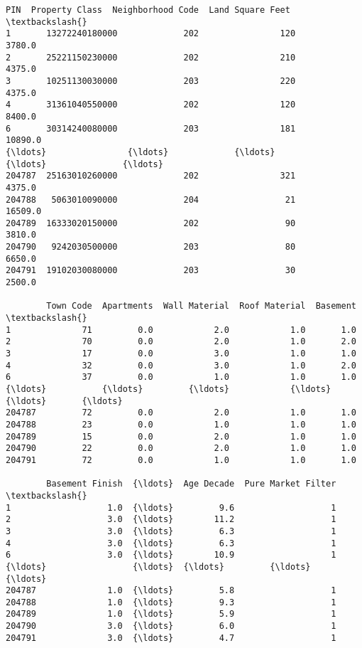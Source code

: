 \documentclass[11pt]{article}
\makeatletter
\newcommand{\boxspacing}{\kern\kvtcb@left@rule\kern\kvtcb@boxsep}
\newcommand{\prompt}[4]{
        {\ttfamily\llap{{\color{#2}[#3]:\hspace{3pt}#4}}\vspace{-\baselineskip}}
    }
\makeatother
\begin{document}
            \begin{tcolorbox}[breakable, size=fbox, boxrule=.5pt, pad at break*=1mm, opacityfill=0]
\prompt{Out}{outcolor}{33}{\boxspacing}
\begin{Verbatim}[commandchars=\\\{\}]
                   PIN  Property Class  Neighborhood Code  Land Square Feet  \textbackslash{}
1       13272240180000             202                120            3780.0
2       25221150230000             202                210            4375.0
3       10251130030000             203                220            4375.0
4       31361040550000             202                120            8400.0
6       30314240080000             203                181           10890.0
{\ldots}                {\ldots}             {\ldots}                {\ldots}               {\ldots}
204787  25163010260000             202                321            4375.0
204788   5063010090000             204                 21           16509.0
204789  16333020150000             202                 90            3810.0
204790   9242030500000             203                 80            6650.0
204791  19102030080000             203                 30            2500.0

        Town Code  Apartments  Wall Material  Roof Material  Basement  \textbackslash{}
1              71         0.0            2.0            1.0       1.0
2              70         0.0            2.0            1.0       2.0
3              17         0.0            3.0            1.0       1.0
4              32         0.0            3.0            1.0       2.0
6              37         0.0            1.0            1.0       1.0
{\ldots}           {\ldots}         {\ldots}            {\ldots}            {\ldots}       {\ldots}
204787         72         0.0            2.0            1.0       1.0
204788         23         0.0            1.0            1.0       1.0
204789         15         0.0            2.0            1.0       1.0
204790         22         0.0            2.0            1.0       1.0
204791         72         0.0            1.0            1.0       1.0

        Basement Finish  {\ldots}  Age Decade  Pure Market Filter  \textbackslash{}
1                   1.0  {\ldots}         9.6                   1
2                   3.0  {\ldots}        11.2                   1
3                   3.0  {\ldots}         6.3                   1
4                   3.0  {\ldots}         6.3                   1
6                   3.0  {\ldots}        10.9                   1
{\ldots}                 {\ldots}  {\ldots}         {\ldots}                 {\ldots}
204787              1.0  {\ldots}         5.8                   1
204788              1.0  {\ldots}         9.3                   1
204789              1.0  {\ldots}         5.9                   1
204790              3.0  {\ldots}         6.0                   1
204791              3.0  {\ldots}         4.7                   1


\end{Verbatim}
\end{tcolorbox}
\end{document}
